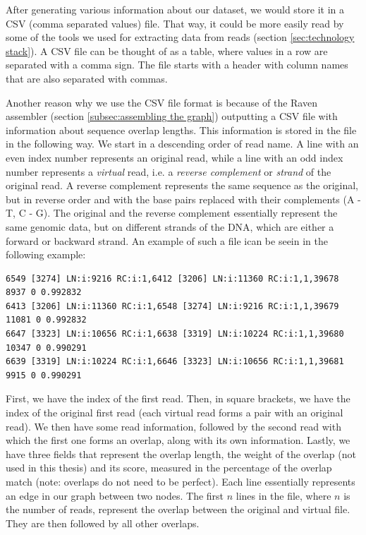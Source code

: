 \documentclass[times, utf8, diplomski, english]{fer_eng}
\begin{document}
After generating various information about our dataset, we would store it in a CSV (comma separated values) file. That way, it could be  more easily read by some of the tools we used for extracting data from reads (section \ref{sec:technology stack}). A CSV file can be thought of as a table, where values in a row are separated with a comma sign. The file starts with a header with column names that are also separated with commas.

Another reason why we use the CSV file format is because of the Raven assembler (section \ref{subsec:assembling the graph}) outputting a CSV file with information about sequence overlap lengths. This information is stored in the file in the following way. We start in a descending order of read name. A line with an even index number represents an original read, while a line with an odd index number represents a \textit{virtual} read, i.e. a \textit{reverse complement} or \textit{strand} of the original read. A reverse complement represents the same sequence as the original, but in reverse order and with the base pairs replaced with their complements (A - T, C - G). The original and the reverse complement essentially represent the same genomic data, but on different strands of the DNA, which are either a forward or backward strand. An example of such a file ican be seein in the following example:

\begin{lstlisting}
6549 [3274] LN:i:9216 RC:i:1,6412 [3206] LN:i:11360 RC:i:1,1,39678 8937 0 0.992832
6413 [3206] LN:i:11360 RC:i:1,6548 [3274] LN:i:9216 RC:i:1,1,39679 11081 0 0.992832
6647 [3323] LN:i:10656 RC:i:1,6638 [3319] LN:i:10224 RC:i:1,1,39680 10347 0 0.990291
6639 [3319] LN:i:10224 RC:i:1,6646 [3323] LN:i:10656 RC:i:1,1,39681 9915 0 0.990291
\end{lstlisting}

First, we have the index of the first read. Then, in square brackets, we have the index of the original first read (each virtual read forms a pair with an original read). We then have some read information, followed by the second read with which the first one forms an overlap, along with its own information. Lastly, we have three fields that represent the overlap length, the weight of the overlap (not used in this thesis) and its score, measured in the percentage of the overlap match (note: overlaps do not need to be perfect). Each line essentially represents an edge in our graph between two nodes. The first $n$ lines in the file, where $n$ is the number of reads, represent the overlap between the original and virtual file. They are then followed by all other overlaps.
\end{document}
